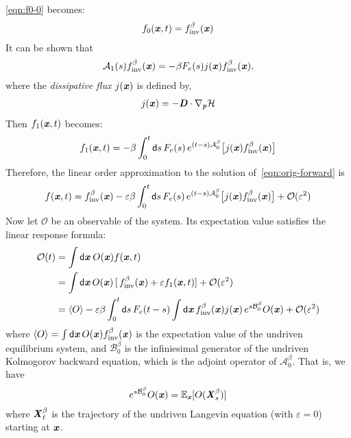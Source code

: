 \documentclass[aip,jcp,a4paper,reprint,onecolumn]{revtex4-1}
\newcommand{\vect}[1]{\textbf{\textit{#1}}}
\newcommand{\dd}{\textsf{d}}
\newcommand{\inv}{\textrm{inv}}
\newcommand{\mh}{\mathcal H}
\newcommand{\eps}{\varepsilon}
\newcommand{\mo}{\mathcal O}
\newcommand{\fwg}{{\mathcal A}}
\newcommand{\bwg}{{\mathcal B}}
\begin{document}
\eqref{eqn:f0-0} becomes:
\begin{align}
  f_0(\vect x, t) = f_{\inv}^\beta(\vect x)
\end{align}
It can be shown that
\begin{align}
  \fwg_1(s) f_{\inv}^\beta(\vect x)
  =
  -\beta {F_e(s)}
  j(\vect x)
  f_{\inv}^\beta(\vect x),
\end{align}
where the \emph{dissipative flux} $j(\vect x)$ is defined by,
\begin{align}
  j(\vect x) =
  -\vect D\cdot\nabla_{\vect p}\mh
\end{align}
Then $f_1(\vect x, t)$ becomes:
\begin{align}
  f_1(\vect x, t)
  =
  -\beta
  \int_0^t\dd s\,
  F_e(s)\,
  e^{(t-s)\fwg^\beta_0}
  \big[
  j(\vect x)
  f_{\inv}^\beta(\vect x)
  \big]
\end{align}
Therefore, the linear order approximation to
the solution of~\eqref{eqn:orig-forward} is 
\begin{align}\label{eqn:solv-orig-linear}
  f(\vect x, t) =
  f_{\inv}^\beta(\vect x)
  - \eps\beta
  \int_0^t\dd s\,
  F_e(s)\,
  e^{(t-s)\fwg^\beta_0}
  \big[
  j(\vect x)
  f_{\inv}^\beta(\vect x)
  \big]
  + \mo(\eps^2)
\end{align}
Now let $\mathcal{O}$ be an observable of the system. Its expectation value satisfies the linear response formula:
\begin{align}\nonumber
  \mathcal O(t)
  &=
  \int\dd \vect x \:O(\vect x)f(\vect x, t)  \\\nonumber
  &=
  \int\dd \vect x\, O(\vect x)\,
  [\,f_{\inv}^\beta(\vect x) + \eps f_1(\vect x, t)] +\mathcal{O}(\eps^2)\\\nonumber
   \label{eqn:eqi-pert-1}
  &=
  \langle O\rangle
  -
 \eps \beta
  \int_0^t\dd s\,
  F_e(t-s)
  \int \dd \vect x\,
  f^\beta_{\inv}(\vect x) j(\vect x)\,
  e^{s\bwg_0^\beta}
  O(\vect x)+\mathcal{O}(\eps^2)
\end{align}
where $ \langle O\rangle=\int \dd\vect x\,O(\vect x) f_{\inv}^\beta(\vect x)$ is the expectation value of the undriven equilibrium system, and $\bwg^\beta_0$ is the infiniesimal generator of the undriven 
Kolmogorov backward equation, which is the adjoint operator of $\fwg^\beta_0$. That is,
we have
\begin{align}
  e^{s\bwg^\beta_0} O(\vect x) = \mathbb E_{\vect x} [O(\vect X^\beta_s)]
\end{align}
where $\vect X^\beta_t$ is the trajectory of the undriven Langevin equation (with $\eps=0$)
starting at $\vect x$.
\end{document}
